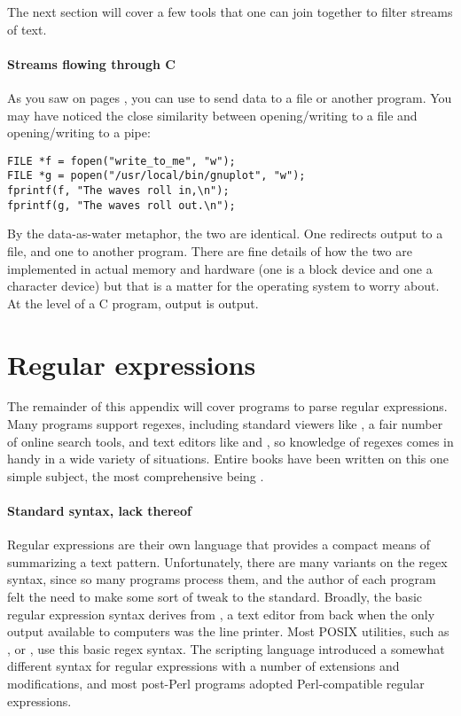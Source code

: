 The next section will cover a few tools that one can join together to
filter streams of text.

\paragraph{Streams flowing through C}
As you saw on pages \pageref{fprintf}{\it ff}, you can use 
to send data to a file or another program. You may have noticed the
close similarity between opening/writing to a file and opening/writing
to a pipe:
\begin{lstlisting}
FILE *f = fopen("write_to_me", "w");
FILE *g = popen("/usr/local/bin/gnuplot", "w");
fprintf(f, "The waves roll in,\n");
fprintf(g, "The waves roll out.\n");
\end{lstlisting}
By the data-as-water metaphor, the two are identical. One redirects
output to a file, and one to another program. There are fine details of
how the two are implemented in actual memory and hardware (one is a
block device and one a character device) but that is a matter for the
operating system to worry about. At the level of a C program, output is
output.

\section{Regular expressions}
The remainder of this appendix will cover programs to parse regular
expressions.  Many programs support regexes, including standard viewers
like , a fair number of online search tools, and text editors
like  and , so knowledge of regexes comes in handy
in a wide variety of situations. Entire books have been written on this
one simple subject, the most comprehensive being \citet{friedl:regex}.

\paragraph{Standard syntax, lack thereof} Regular expressions are
their own language that provides a compact means of summarizing a text
pattern. Unfortunately, there are many variants on the regex syntax,
since so many programs process them, and the author of each program felt
the need to make some sort of tweak to the standard.  Broadly, the basic
regular expression syntax derives from , a text editor from back
when the only output available to computers was the line printer. Most
POSIX utilities, such as ,  or ,
use this basic regex syntax. The scripting language 
introduced a somewhat different syntax for regular expressions with
a number of extensions and modifications, and most post-Perl programs
adopted Perl-compatible regular expressions.

